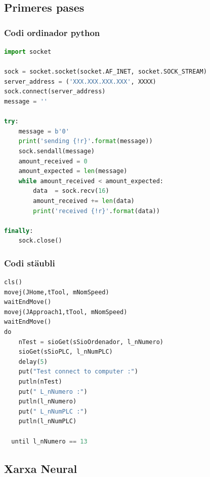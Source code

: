 ﻿\documentclass[10pt,a4paper,twocolumn,twoside]{article}
\begin{document}
\subsection{Primeres pases}
\subsubsection{Codi ordinador python}

\begin{lstlisting}[language=Python]
import socket

sock = socket.socket(socket.AF_INET, socket.SOCK_STREAM)
server_address = ('XXX.XXX.XXX.XXX', XXXX)
sock.connect(server_address)
message = ''

try:
    message = b'0'
    print('sending {!r}'.format(message))
    sock.sendall(message)
    amount_received = 0
    amount_expected = len(message)
    while amount_received < amount_expected:
        data  = sock.recv(16)
        amount_received += len(data)
        print('received {!r}'.format(data))

finally:
    sock.close()

\end{lstlisting}

\subsubsection{Codi stäubli}

\begin{lstlisting}[language=Python]
cls()
movej(JHome,tTool, mNomSpeed)
waitEndMove()
movej(JApproach1,tTool, mNomSpeed)
waitEndMove()
do
    nTest = sioGet(sSioOrdenador, l_nNumero)
    sioGet(sSioPLC, l_nNumPLC)
    delay(5)
    put("Test connect to computer :")
    putln(nTest)
    put(" L_nNumero :")
    putln(l_nNumero)
    put(" L_nNumPLC :")
    putln(l_nNumPLC)
 
  until l_nNumero == 13
\end{lstlisting}

\subsection{Xarxa Neural}
\end{document}

